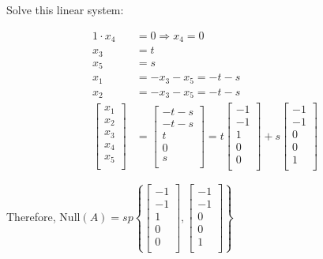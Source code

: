 \documentclass[
]{article}
\begin{document}
Solve this linear system:

\begin{align*}
1 \cdot x_{4} &= 0 \Rightarrow x_{4} = 0
 \\
x_{3} &= t
 \\
x_{5} &= s
 \\
x_{1} &= - x_{3} - x_{5} = - t - s
 \\
x_{2} &= - x_{3} - x_{5} = - t - s
 \\
\begin{bmatrix}
x_{1} \\
x_{2} \\
x_{3} \\
x_{4} \\
x_{5} \\
\end{bmatrix} &= \begin{bmatrix}
 - t - s \\
 - t - s \\
t \\
0 \\
s \\
\end{bmatrix} = t\begin{bmatrix}
 - 1 \\
 - 1 \\
1 \\
0 \\
0 \\
\end{bmatrix} + s\begin{bmatrix}
 - 1 \\
 - 1 \\
0 \\
0 \\
1 \\
\end{bmatrix}
\end{align*}


Therefore, $\text{Null}(A) = sp\left\{ \begin{bmatrix}
 - 1 \\
 - 1 \\
1 \\
0 \\
0 \\
\end{bmatrix},\begin{bmatrix}
 - 1 \\
 - 1 \\
0 \\
0 \\
1 \\
\end{bmatrix} \right\}$
\end{document}
